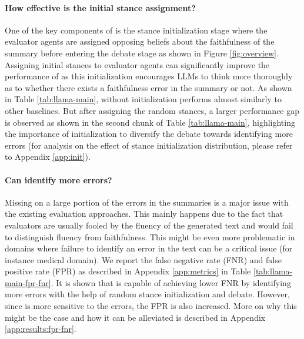 \paragraph{How effective is the initial stance assignment?}
One of the key components of \method is the stance initialization stage where the evaluator agents are assigned opposing beliefs about the faithfulness of the summary before entering the debate stage as shown in Figure \ref{fig:overview}. 
Assigning initial stances to evaluator agents can significantly improve the performance of \method as this initialization encourages LLMs to think more thoroughly as to whether there exists a faithfulness error in the summary or not. As shown in Table \ref{tab:llama-main}, \method without initialization performs almost similarly to other baselines. But after assigning the random stances, a larger performance gap is observed as shown in the second chunk of Table \ref{tab:llama-main}, highlighting the importance of initialization to diversify the debate towards identifying more errors (for analysis on the effect of stance initialization distribution, please refer to Appendix \ref{app:init}).

\paragraph{Can \method identify more errors?}
% 
Missing on a large portion of the errors in the summaries is a major issue with the existing evaluation approaches. This mainly happens due to the fact that evaluators are usually fooled by the fluency of the generated text and would fail to distinguish fluency from faithfulness. This might be even more problematic in domains where failure to identify an error in the text can be a critical issue (for instance medical domain).
% 
We report the false negative rate (FNR) and false positive rate (FPR) as described in Appendix \ref{app:metrics} in Table \ref{tab:llama-main-fpr-fnr}.
It is shown that \method is capable of achieving lower FNR by identifying more errors with the help of random stance initialization and debate.
However, since \method is more sensitive to the errors, the FPR is also increased. 
More on  why this might be the case and how it can be alleviated is described in Appendix \ref{app:results:fpr-fnr}.


